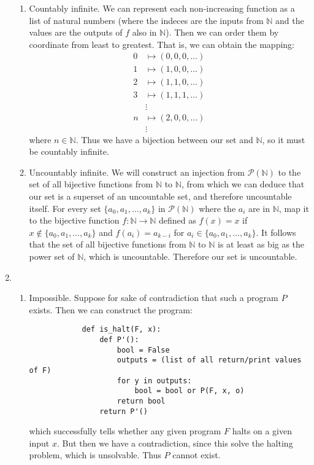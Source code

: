 \begin{enumerate}
\begin{enumerate}
        \item Countably infinite. We can represent each non-increasing function as a list of natural numbers (where the indeces are the inputs from $\mathbb{N}$ and the values are the outputs of $f$ also in $\mathbb{N}$). Then we can order them by coordinate from least to greatest. That is, we can obtain the mapping:
        \begin{align*}
            0 &\mapsto (0, 0, 0, \ldots) \\
            1 &\mapsto (1, 0, 0, \ldots) \\
            2 &\mapsto (1, 1, 0, \ldots) \\
            3 &\mapsto (1, 1, 1, \ldots) \\
              &\vdots \\
            n &\mapsto (2, 0, 0, \ldots) \\
              &\vdots
        \end{align*}
        where $n \in \mathbb{N}$. Thus we have a bijection between our set and $\mathbb{N}$, so it must be countably infinite.
        
        \item Uncountably infinite. We will construct an injection from $\mathcal{P}(\mathbb{N})$ to the set of all bijective functions from $\mathbb{N}$ to $\mathbb{N}$, from which we can deduce that our set is a superset of an uncountable set, and therefore uncountable itself. For every set $\{a_0, a_1, \ldots, a_k\}$ in $\mathcal{P}(\mathbb{N})$ where the $a_i$ are in $\mathbb{N}$, map it to the bijective function $f: \mathbb{N} \to \mathbb{N}$ defined as $f(x) = x$ if $x \not\in \{a_0, a_1, \ldots, a_k\}$ and $f(a_i) = a_{k - i}$ for $a_i \in \{a_0, a_1, \ldots, a_k\}$. It follows that the set of all bijective functions from $\mathbb{N}$ to $\mathbb{N}$ is at least as big as the power set of $\mathbb{N}$, which is uncountable. Therefore our set is uncountable.
      
    \end{enumerate}
    
    \item \begin{enumerate}
        \item Impossible. Suppose for sake of contradiction that such a program $P$ exists. Then we can construct the program:
        \begin{verbatim}
            def is_halt(F, x):
                def P'():
                    bool = False
                    outputs = (list of all return/print values of F)
                    for y in outputs:
                        bool = bool or P(F, x, o)
                    return bool
                return P'()
        \end{verbatim}
        which successfully tells whether any given program $F$ halts on a given input $x$. But then we have a contradiction, since this solve the halting problem, which is unsolvable. Thus $P$ cannot exist.
        

\end{enumerate}
\end{enumerate}
